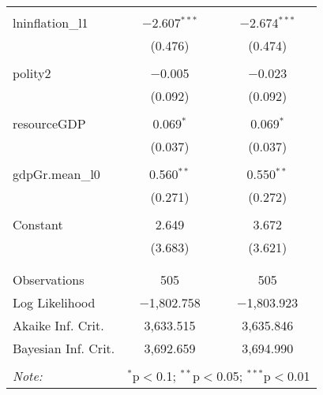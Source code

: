 \begin{table}[!htbp]
\begin{tabular}{@{\extracolsep{5pt}}lcc}
  & & \\ 
 lninflation\_l1 & $-$2.607$^{***}$ & $-$2.674$^{***}$ \\ 
  & (0.476) & (0.474) \\ 
  & & \\ 
 polity2 & $-$0.005 & $-$0.023 \\ 
  & (0.092) & (0.092) \\ 
  & & \\ 
 resourceGDP & 0.069$^{*}$ & 0.069$^{*}$ \\ 
  & (0.037) & (0.037) \\ 
  & & \\ 
 gdpGr.mean\_l0 & 0.560$^{**}$ & 0.550$^{**}$ \\ 
  & (0.271) & (0.272) \\ 
  & & \\ 
 Constant & 2.649 & 3.672 \\ 
  & (3.683) & (3.621) \\ 
  & & \\ 
\hline \\[-1.8ex] 
Observations & 505 & 505 \\ 
Log Likelihood & $-$1,802.758 & $-$1,803.923 \\ 
Akaike Inf. Crit. & 3,633.515 & 3,635.846 \\ 
Bayesian Inf. Crit. & 3,692.659 & 3,694.990 \\ 
\hline 
\hline \\[-1.8ex] 
\textit{Note:}  & \multicolumn{2}{r}{$^{*}$p$<$0.1; $^{**}$p$<$0.05; $^{***}$p$<$0.01} \\ 
\end{tabular} 
\end{table} 